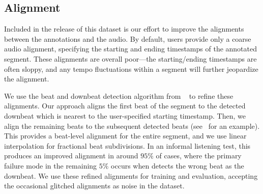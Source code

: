 \subsection{Alignment}

Included in the release of this dataset is our effort to improve the alignments between the annotations and the audio. 
By default, users provide only a coarse audio alignment, specifying the starting and ending timestamps of the annotated segment. 
These alignments are overall poor---the starting/ending timestamps are often sloppy, and any tempo fluctuations within a segment will further jeopardize the alignment.

We use the beat and downbeat detection algorithm from \madmom{}~\cite{bock2016joint,bock2016madmom} to refine these alignments. 
Our approach aligns the first beat of the segment to the detected downbeat which is nearest to the user-specified starting timestamp. 
Then, we align the remaining beats to the subsequent detected beats (see~ for an example). 
This provides a beat-level alignment for the entire segment, and we use linear interpolation for fractional beat subdivisions. 
In an informal listening test, this produces an improved alignment in around $95\%$ of cases, where the primary failure mode in the remaining $5\%$ occurs when \madmom{} detects the wrong beat as the downbeat. 
We use these refined alignments for training and evaluation, accepting the occasional glitched alignments as noise in the dataset.